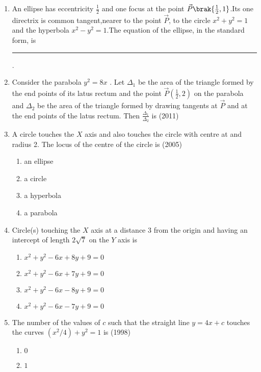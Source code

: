 \begin{enumerate}[label=\thesubsection.\arabic*.,ref=\thesubsection.\theenumi]
    \item An ellipse has eccentricity $\frac{1}{2}$ and one focus at the point $\vec{P}\brak{\frac{1}{2},1}$.Its one directrix is common tangent,nearer to the point $\vec{P}$, to the circle $x^2+y^2=1$ and the hyperbola $x^2-y^2=1$.The equation of the ellipse, in the standard form, is \rule{1cm}{0.1pt}.
    \hfill{} 
\item Consider the parabola $y^2=8x$ . Let $\Delta_1$ be the area of the triangle formed by the end points of its latus rectum and the point $\Vec{P}(\frac{1}{2},2)$ on the parabola and $\Delta_2$ be the area of the triangle formed by drawing tangents at $\Vec{P}$ and at the end points of the latus rectum. Then $\frac{\Delta_1}{\Delta_2}$ is 
\hfill(2011)
\item A circle touches the $X$ axis and also touches the circle with centre at  and radius 2. The locus of the centre of the circle is
\hfill{(2005)}
\begin{multicols}{4}
\begin{enumerate}
\item an ellipse
\item a circle 
\item a hyperbola
\item a parabola
\end{enumerate}
\end{multicols}
\item Circle(s) touching the $X$ axis at a distance 3 from the origin and having an intercept of length $2\sqrt{7}$ on the $Y$ axis is 
%
\hfill{}
\begin{multicols}{2}
\begin{enumerate}
\item $x^2 + y^2 - 6x + 8y + 9 = 0$
\item $x^2 + y^2 - 6x + 7y + 9 = 0$
\item $x^2 + y^2 - 6x - 8y + 9 = 0$
\item $x^2 + y^2 - 6x - 7y + 9 = 0$
\end{enumerate}
\end{multicols}
    \item The number of the values of $c$ such that the straight line $y=4x+c$ touches the curves $(x^2/4)+y^2=1$ is \hfill(1998)\\
	\begin{multicols}{4}
\begin{enumerate}
	\item $0$
	\item $1$

\end{enumerate}
\end{multicols}
\end{enumerate}
